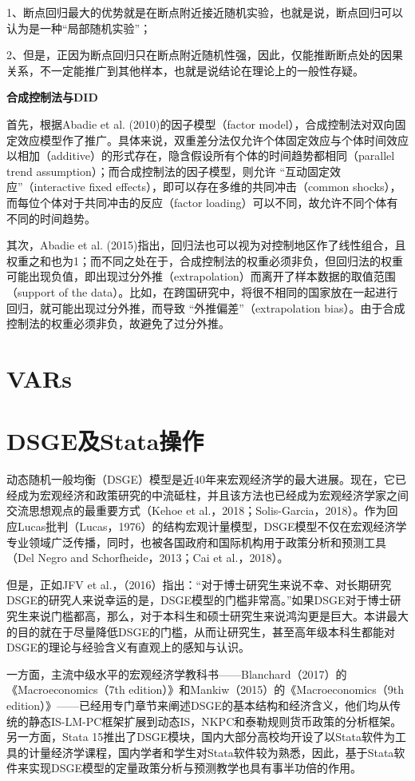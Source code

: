 \documentclass[cn,12pt,math=newtx,citestyle=gb7714-2015,bibstyle=gb7714-2015]{elegantbook}
\begin{document}
	1、断点回归最大的优势就是在断点附近接近随机实验，也就是说，断点回归可以认为是一种“局部随机实验”；
	
	2、但是，正因为断点回归只在断点附近随机性强，因此，仅能推断断点处的因果关系，不一定能推广到其他样本，也就是说结论在理论上的一般性存疑。
	
	
	\textbf{合成控制法与DID}
	
	首先，根据Abadie et al. (2010)的因子模型（factor model），合成控制法对双向固定效应模型作了推广。具体来说，双重差分法仅允许个体固定效应与个体时间效应以相加（additive）的形式存在，隐含假设所有个体的时间趋势都相同（parallel trend assumption）；而合成控制法的因子模型，则允许 “互动固定效应”（interactive fixed effects），即可以存在多维的共同冲击（common shocks），而每位个体对于共同冲击的反应（factor loading）可以不同，故允许不同个体有不同的时间趋势。
	
	其次，Abadie et al. (2015)指出，回归法也可以视为对控制地区作了线性组合，且权重之和也为1；而不同之处在于，合成控制法的权重必须非负，但回归法的权重可能出现负值，即出现过分外推（extrapolation）而离开了样本数据的取值范围（support of the data）。比如，在跨国研究中，将很不相同的国家放在一起进行回归，就可能出现过分外推，而导致 “外推偏差”（extrapolation bias）。由于合成控制法的权重必须非负，故避免了过分外推。
	
	\chapter{VARs}
	
	
	\chapter{DSGE及Stata操作}
	
	动态随机一般均衡（DSGE）模型是近40年来宏观经济学的最大进展。现在，它已经成为宏观经济和政策研究的中流砥柱，并且该方法也已经成为宏观经济学家之间交流思想观点的最重要方式（Kehoe et al.，2018；Solis-Garcia，2018）。作为回应Lucas批判（Lucas，1976）的结构宏观计量模型，DSGE模型不仅在宏观经济学专业领域广泛传播，同时，也被各国政府和国际机构用于政策分析和预测工具（Del Negro and Schorfheide，2013；Cai et al.，2018）。
	
	但是，正如JFV et al.，（2016）指出：“对于博士研究生来说不幸、对长期研究DSGE的研究人来说幸运的是，DSGE模型的门槛非常高。”如果DSGE对于博士研究生来说门槛都高，那么，对于本科生和硕士研究生来说鸿沟更是巨大。本讲最大的目的就在于尽量降低DSGE的门槛，从而让研究生，甚至高年级本科生都能对DSGE的理论与经验含义有直观上的感知与认识。
	
	一方面，主流中级水平的宏观经济学教科书——Blanchard（2017）的《Macroeconomics（7th edition）》和Mankiw（2015）的《Macroeconomics（9th edition）》——已经用专门章节来阐述DSGE的基本结构和经济含义，他们均从传统的静态IS-LM-PC框架扩展到动态IS，NKPC和泰勒规则货币政策的分析框架。另一方面，Stata 15推出了DSGE模块，国内大部分高校均开设了以Stata软件为工具的计量经济学课程，国内学者和学生对Stata软件较为熟悉，因此，基于Stata软件来实现DSGE模型的定量政策分析与预测教学也具有事半功倍的作用。
	
\end{document}
